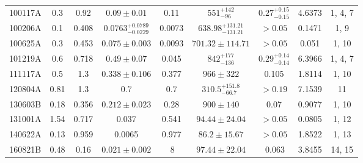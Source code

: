 \documentclass[a4paper,fleqn,usenatbib]{mnras}
\begin{document}
\begin{table*}
{\begin{tabular}[width=1.0 \linewidth]{ccccccccc}
\\																																																																					100117A &	0.3 &	0.92  &	$0.09 \pm 0.01$ &	0.11 &	$551_{-96}^{+142}$ &	$0.27_{-0.15}^{+0.15}$ &	4.6373 &	1, 4, 7  \\																																																																					100206A &	0.1 &	0.408  &	$0.0763_{-0.0229}^{+0.0789}$ &	0.0073 &	$638.98_{-131.21}^{+131.21}$ &	$>0.05$ &	0.1471 &	1, 9 \\																																																																					100625A &	0.3 &	0.453  &	$0.075\pm0.003$ &	0.0093 &	$701.32 \pm 114.71$ &	$>0.05$ &	0.051 &	1, 10 \\																																																																					101219A &	0.6 &	0.718  &	$0.49 \pm 0.07$ &	0.045 &	$842_{-136}^{+177}$ &	$0.29_{-0.14}^{+0.14}$  &	6.3966 &	1, 4, 7  \\																																																																					111117A &	0.5 &	1.3 &	$0.338 \pm 0.106$ &	0.377 &	$966 \pm 322$ &	0.105 &	1.8114 &	1, 10 \\																																																																					120804A &	0.81 &	1.3 &	0.7 &	0.7 &	$310.5_{-66.7}^{+151.8}$ &	$>0.19$ &	7.1539 &	11 \\																																																																					130603B   &	0.18 &	0.356 &	$0.212 \pm 0.023$ &	0.28 &	$900 \pm 140$ &	0.07 &	0.9077 &	1,  10 \\																																																																					131001A &	1.54 &	0.717 &	0.037 &	0.541 &	$94.44\pm 24.04$ &	$>0.05$ &	0.0805 &	1, 12 \\																																																																					140622A &	0.13 &	0.959 &	0.0065 &	0.977 &	$86.2\pm 15.67$ &	$>0.05$ &	1.8522 &	1, 13 \\																																																																					160821B &	0.48 &	0.16 &	$0.021\pm0.002$ &	$~8$ &	$97.44\pm 22.04 $ &	$~0.063$ &	3.8455 &	14, 15 \\																																																																																																																																																																																													\hline																																																																			\end{tabular}
}


\end{table*}
\end{document}
